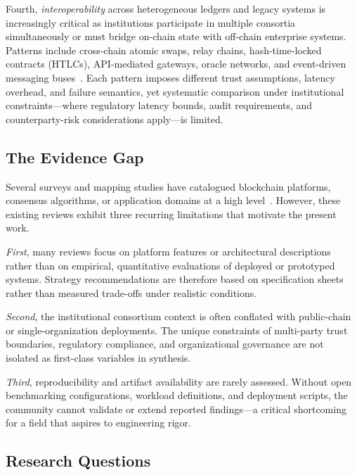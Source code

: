 \documentclass[journal]{IEEEtran}
\begin{document}
Fourth, \emph{interoperability} across heterogeneous ledgers and legacy systems is increasingly critical as institutions participate in multiple consortia simultaneously or must bridge on-chain state with off-chain enterprise systems.
Patterns include cross-chain atomic swaps, relay chains, hash-time-locked contracts (HTLCs), API-mediated gateways, oracle networks, and event-driven messaging buses~\cite{belchior2021survey,schulte2019towards,ren2023interoperability,madine2021appxchain,alhussayen2024oracle,patsonakis2019crosschain}.
Each pattern imposes different trust assumptions, latency overhead, and failure semantics, yet systematic comparison under institutional constraints---where regulatory latency bounds, audit requirements, and counterparty-risk considerations apply---is limited.

\subsection{The Evidence Gap}

Several surveys and mapping studies have catalogued blockchain platforms, consensus algorithms, or application domains at a high level~\cite{casino2019systematic,wang2019blockchain,ali2020comparative}.
However, these existing reviews exhibit three recurring limitations that motivate the present work.

\emph{First}, many reviews focus on platform features or architectural descriptions rather than on empirical, quantitative evaluations of deployed or prototyped systems.
Strategy recommendations are therefore based on specification sheets rather than measured trade-offs under realistic conditions.

\emph{Second}, the institutional consortium context is often conflated with public-chain or single-organization deployments.
The unique constraints of multi-party trust boundaries, regulatory compliance, and organizational governance are not isolated as first-class variables in synthesis.

\emph{Third}, reproducibility and artifact availability are rarely assessed.
Without open benchmarking configurations, workload definitions, and deployment scripts, the community cannot validate or extend reported findings---a critical shortcoming for a field that aspires to engineering rigor.

\subsection{Research Questions}
\end{document}
